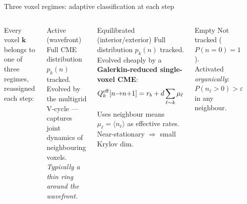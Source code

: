 \documentclass[10pt,aspectratio=169]{beamer}
\begin{document}
\begin{frame}{Three voxel regimes: adaptive classification at each step}

\begin{columns}[T]

Every voxel $\mathbf{k}$ belongs to one of three regimes, reassigned each step:

\medskip
\begin{block}{\textcolor{activegreen!80!black}{Active} (wavefront)}
  Full CME distribution $p_k(n)$ tracked.\\
  Evolved by the multigrid V-cycle --- captures joint dynamics of neighbouring voxels.\\
  \emph{Typically a thin ring around the wavefront.}
\end{block}

\begin{block}{\textcolor{equilpurple}{Equilibrated} (interior/exterior)}
  Full distribution $p_k(n)$ tracked.\\
  Evolved cheaply by a \textbf{Galerkin-reduced single-voxel CME}:
  \[
    Q_k^{\rm eff}[n{\to}n{+}1] = r_b + d\sum_{\ell\sim k}\mu_\ell
  \]
  Uses neighbour means $\mu_\ell = \langle n_\ell\rangle$ as effective rates.\\
  Near-stationary $\Rightarrow$ small Krylov dim.
\end{block}

\begin{block}{\textcolor{mygray}{Empty}}
  Not tracked ($P(n{=}0)=1$).\\
  Activated \emph{organically}: $P(n_\ell{>}0)>\varepsilon$ in any neighbour.
\end{block}

\vspace{0.2em}
\begin{center}
\end{center}


\end{columns}
\end{frame}
\end{document}
